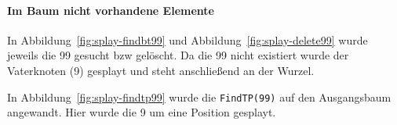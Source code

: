 \paragraph{Im Baum nicht vorhandene Elemente}

In Abbildung~\ref{fig:splay-findbt99} und Abbildung~\ref{fig:splay-delete99} wurde jeweils die
99 gesucht bzw gelöscht.
Da die 99 nicht existiert wurde der Vaterknoten (9) gesplayt und steht anschließend an der Wurzel.

In Abbildung~\ref{fig:splay-findtp99} wurde die \verb|FindTP(99)| auf den Ausgangsbaum angewandt.
Hier wurde die 9 um eine Position gesplayt.

\begin{figure}[hbt]
    \centering

\end{figure}
